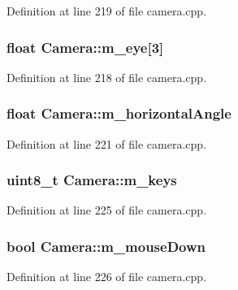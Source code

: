Definition at line 219 of file camera.\+cpp.

\hypertarget{struct_camera_ab82b32b1598184a46dcf73b3269c25a2}{
\subsubsection[{m\+\_\+eye}]{\setlength{\rightskip}{0pt plus 5cm}float Camera\+::m\+\_\+eye\mbox{[}3\mbox{]}}}\label{struct_camera_ab82b32b1598184a46dcf73b3269c25a2}


Definition at line 218 of file camera.\+cpp.

\hypertarget{struct_camera_a5fb30951943adae849d4ae5c87e92dec}{
\subsubsection[{m\+\_\+horizontal\+Angle}]{\setlength{\rightskip}{0pt plus 5cm}float Camera\+::m\+\_\+horizontal\+Angle}}\label{struct_camera_a5fb30951943adae849d4ae5c87e92dec}


Definition at line 221 of file camera.\+cpp.

\hypertarget{struct_camera_ad60098c35ad058dd63f692d5b5223fbf}{
\subsubsection[{m\+\_\+keys}]{\setlength{\rightskip}{0pt plus 5cm}uint8\+\_\+t Camera\+::m\+\_\+keys}}\label{struct_camera_ad60098c35ad058dd63f692d5b5223fbf}


Definition at line 225 of file camera.\+cpp.

\hypertarget{struct_camera_a12c60bfc3b7ae9fadf93d3494d8b599f}{
\subsubsection[{m\+\_\+mouse\+Down}]{\setlength{\rightskip}{0pt plus 5cm}bool Camera\+::m\+\_\+mouse\+Down}}\label{struct_camera_a12c60bfc3b7ae9fadf93d3494d8b599f}


Definition at line 226 of file camera.\+cpp.

